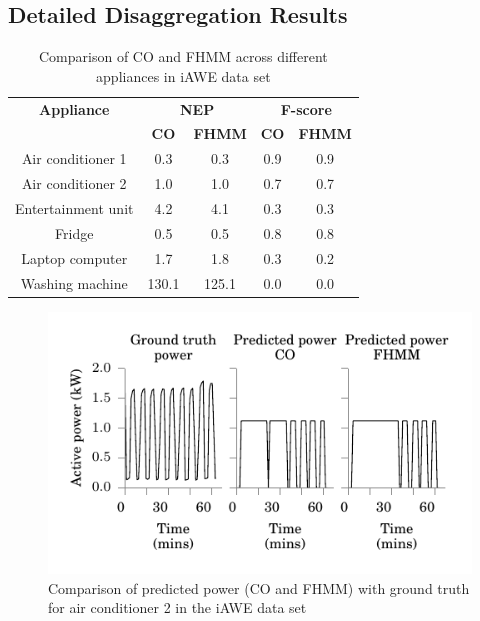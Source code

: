 \documentclass{sig-alternate}
\begin{document}
\subsection{Detailed Disaggregation Results}

\tabcolsep=0.14cm
\begin{table}[t]
    \begin{tabular}{ccccc}
    \hline \textbf{Appliance} & \multicolumn{2}{c}{\textbf{NEP}} & \multicolumn{2}{c}{\textbf{F-score}}\\
    ~                  & \textbf{CO}    & \textbf{FHMM}  & \textbf{CO}      & \textbf{FHMM} \\ \hline
    Air conditioner 1  & 0.3   & 0.3   & 0.9     & 0.9  \\
    Air conditioner 2  & 1.0   & 1.0   & 0.7     & 0.7  \\
    Entertainment unit & 4.2   & 4.1   & 0.3     & 0.3  \\
    Fridge             & 0.5   & 0.5   & 0.8     & 0.8  \\
    Laptop computer    & 1.7   & 1.8   & 0.3     & 0.2  \\
    Washing machine    & 130.1 & 125.1 & 0.0     & 0.0  \\
    \hline \end{tabular}
    \caption{Comparison of CO and FHMM across different appliances in iAWE data set}
\label{table:disaggregation_iawe}
\end{table}


\begin{figure}
\includegraphics{figures/ac_2.pdf} 
\caption{Comparison of predicted power (CO and FHMM) with ground truth for air conditioner 2 in the iAWE data set}
\label{fig:ac_disaggregation} 
\end{figure}
\end{document}
